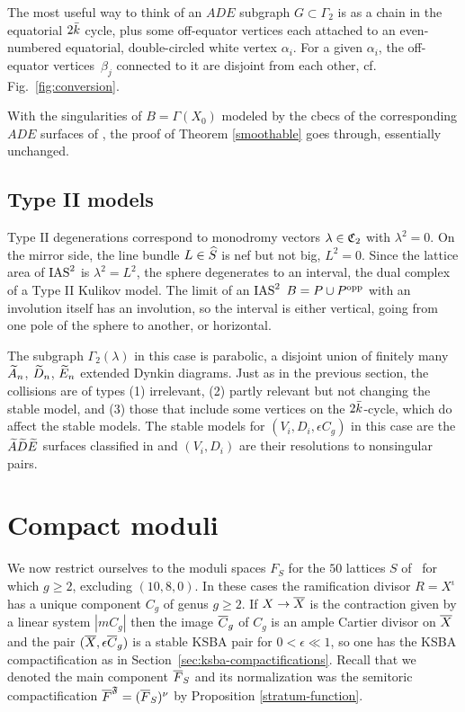 \documentclass{amsart}
\begin{document}
The most useful way to think of an $ADE$ subgraph $G\subset\Gamma_2$ is
as a chain in the  
equatorial $2\bar k$ cycle, plus some off-equator vertices each
attached to an even-numbered equatorial,
double-circled white vertex $\alpha_i$. For a given
$\alpha_i$, the off-equator vertices~$\beta_j$ connected to it are
disjoint from each other, cf. Fig.~\ref{fig:conversion}.

With the singularities of $B=\Gamma(X_0)$ 
modeled by the cbecs of the corresponding $ADE$ surfaces 
of \cite{alexeev17ade-surfaces}, the proof of Theorem \ref{smoothable}
goes through, essentially unchanged.

\subsection{Type II models}
\label{sec:type2-models}

Type II degenerations correspond to monodromy vectors
$\lambda\in{\mathfrak C}_2$ with $\lambda^2=0$. On the mirror side, the line bundle
$L\in{\widehat S}$ is nef but not big, $L^2=0$. Since the lattice area of
$\operatorname{IAS}^2$ is $\lambda^2=L^2$, the sphere degenerates to an interval, the dual
complex of a Type II Kulikov model. The limit of an $\operatorname{IAS}^2$
$B=P\cup P^{\rm opp}$ with an involution itself has an involution, so the
interval is either vertical, going from one pole of the sphere to
another, or horizontal.

The subgraph $\Gamma_2(\lambda)$ in this case is parabolic, a disjoint
union of finitely many ${\widetilde A}_n$, ${\widetilde D}_n$, ${\widetilde E}_n$ extended Dynkin
diagrams. Just as in the previous section, the collisions are of types
(1) irrelevant, (2) partly relevant but not changing the stable model,
and (3) those that include some vertices on the $2\bar k$-cycle, which do
affect the stable models. The stable models for
$(V_i,D_i,\epsilon C_g)$ in this case are the ${\widetilde A}{\widetilde D}{\widetilde E}$ surfaces
classified in \cite{alexeev17ade-surfaces} and $(V_i,D_i)$ are their
resolutions to nonsingular pairs.



\section{Compact moduli}
\label{sec:compact-moduli}


We now restrict ourselves to the moduli spaces $F_S$ for the $50$
lattices $S$ of \fign\ for which $g\ge2$, excluding $(10,8,0)$. In
these cases the ramification divisor $R=X^\iota$ has a unique
component $C_g$ of genus $g\ge2$. If $X\to{\overline X}$ is the contraction
given by a linear system $|mC_g|$ then the image ${\overline C}_g$ of $C_g$ is
an ample Cartier divisor on ${\overline X}$ and the pair $({\overline X}, \epsilon{\overline C}_g)$
is a stable KSBA pair for $0<\epsilon\ll1$, so one has the KSBA
compactification as in
Section~\ref{sec:ksba-compactifications}. Recall that we denoted the
main component ${\overline F}_S$ and its normalization was the semitoric compactification
${\overline F}^{\mathfrak F}=({\overline F}_S)^\nu$ by Proposition \ref{stratum-function}. 
\end{document}
